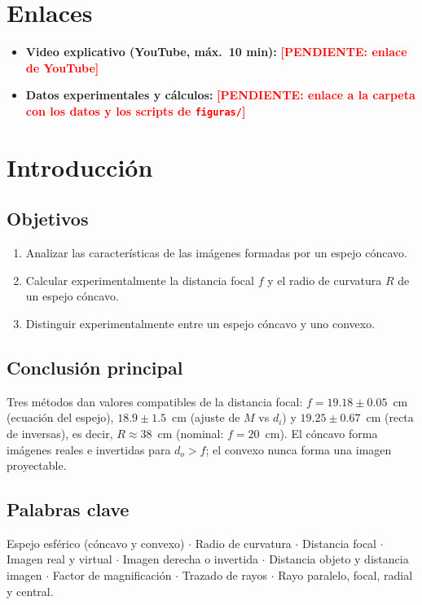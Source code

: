 \documentclass[11pt,a4paper]{article}
\newcommand{\pendiente}[1]{\textcolor{red}{\textbf{[PENDIENTE: #1]}}}
\begin{document}
\section*{Enlaces}
\begin{itemize}
  \item \textbf{Video explicativo (YouTube, máx.\ 10 min):} \pendiente{enlace de YouTube}
  \item \textbf{Datos experimentales y cálculos:} \pendiente{enlace a la carpeta con los datos y los scripts de \texttt{figuras/}}
\end{itemize}

\section{Introducción}

\subsection{Objetivos}
\begin{enumerate}
  \item Analizar las características de las imágenes formadas por un espejo cóncavo.
  \item Calcular experimentalmente la distancia focal $f$ y el radio de curvatura $R$ de un espejo cóncavo.
  \item Distinguir experimentalmente entre un espejo cóncavo y uno convexo.
\end{enumerate}

\subsection{Conclusión principal}
Tres métodos dan valores compatibles de la distancia focal: $f = 19.18 \pm 0.05$~cm (ecuación del espejo), $18.9 \pm 1.5$~cm (ajuste de $M$ vs $d_i$) y $19.25 \pm 0.67$~cm (recta de inversas), es decir, $R \approx 38$~cm (nominal: $f = 20$~cm). El cóncavo forma imágenes reales e invertidas para $d_o > f$; el convexo nunca forma una imagen proyectable.

\subsection{Palabras clave}
Espejo esférico (cóncavo y convexo) $\cdot$ Radio de curvatura $\cdot$ Distancia focal $\cdot$ Imagen real y virtual $\cdot$ Imagen derecha o invertida $\cdot$ Distancia objeto y distancia imagen $\cdot$ Factor de magnificación $\cdot$ Trazado de rayos $\cdot$ Rayo paralelo, focal, radial y central.
\end{document}

